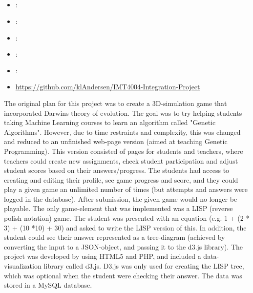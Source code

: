 \subsection[Integration project]{}
\label{sec:key}
\begin{itemize} 
	\item {}: 
	\item {}: 
	\item {}: 
	\item {}: 
	\item {}: 
	\item {} \url{https://github.com/klAndersen/IMT4004-Integration-Project}
\end{itemize} 
The original plan for this project was to create a 3D-simulation game that incorporated Darwins theory of evolution. 
The goal was to try helping students taking Machine Learning courses to learn an algorithm called "Genetic Algorithms". 
However, due to time restraints and complexity, this was changed and reduced to an unfinished web-page version (aimed at teaching Genetic Programming).
\vspace{0.5em}\newline
This version consisted of pages for students and teachers, where teachers could create new assignments, 
check student participation and adjust student scores based on their answers/progress. 
The students had access to creating and editing their profile, see game progress and score, and they could play a given game an unlimited number of times 
(but attempts and answers were logged in the database). 
After submission, the given game would no longer be playable.
\vspace{0.5em}\newline
The only game-element that was implemented was a LISP (reverse polish notation) game. 
The student was presented with an equation (e.g. 1 + (2 * 3) + (10 *10) + 30) and asked to write the LISP version of this. 
In addition, the student could see their answer represented as a tree-diagram (achieved by converting the input to a JSON-object, and passing it to the d3.js library).
\vspace{0.5em}\newline
The project was developed by using HTML5 and PHP, and included a data-visualization library called d3.js. 
D3.js was only used for creating the LISP tree, which was optional when the student were checking their answer. 
The data was stored in a MySQL database.
